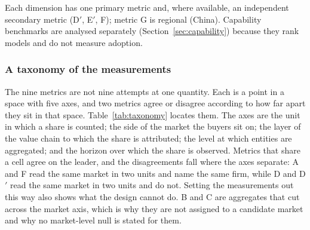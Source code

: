 \documentclass[11pt]{article}
\begin{document}
\noindent Each dimension has one primary metric and, where available, an independent secondary metric (D$'$, E$'$, F); metric G is regional (China). Capability benchmarks are analysed separately (Section~\ref{sec:capability}) because they rank models and do not measure adoption.

\subsubsection{A taxonomy of the measurements}

The nine metrics are not nine attempts at one
quantity. Each is a point in a space with five axes, and two metrics agree or disagree according to how
far apart they sit in that space. Table~\ref{tab:taxonomy} locates them. The axes are the unit in which a
share is counted; the side of the market the buyers sit on; the layer of the value chain to which the
share is attributed; the level at which entities are aggregated; and the horizon over which the share is
observed. Metrics that share a cell agree on the leader, and the disagreements fall where the axes
separate: A and F read the same market in two units and name the same firm, while D and D$'$ read the
same market in two units and do not. Setting the measurements out this way also shows what the design
cannot do. B and C are aggregates that cut across the market axis, which is why they are not assigned to
a candidate market and why no market-level null is stated for them.
\end{document}
